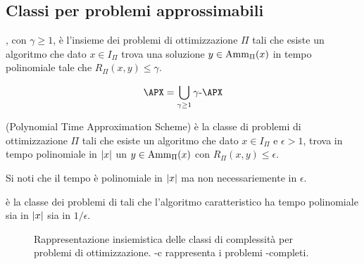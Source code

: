 \subsection{Classi per problemi approssimabili}

\begin{defin}[\gAPX{$\gamma$}]
	\gAPX{$\gamma$}, con $\gamma\geq1$, è l'insieme dei problemi di ottimizzazione $\Pi$ tali che esiste un algoritmo che dato $x\in I_\Pi$ trova una soluzione $y\in\mathrm{Amm}_\Pi(x)$ in tempo polinomiale tale che $R_\Pi(x,y)\leq \gamma$.
\end{defin}
\begin{defin}[\APX]
	\begin{equation*}
		\APX=\bigcup_{\gamma\geq1} \gAPX{\gamma}
	\end{equation*}
\end{defin}

\begin{defin}[\PTAS]
	\PTAS (Polynomial Time Approximation Scheme) è la classe di problemi di ottimizzazione $\Pi$ tali che esiste un algoritmo che dato $x\in I_\Pi$ e $\epsilon>1$, trova in tempo polinomiale in $|x|$ un $y\in\mathrm{Amm}_\Pi(x)$ con $R_\Pi(x,y)\leq\epsilon$.
\end{defin}
\noindent Si noti che il tempo è polinomiale in $|x|$ ma non necessariemente in $\epsilon$.
\begin{defin}[\FPTAS]
	\FPTAS è la classe dei problemi di \PTAS tali che l'algoritmo caratteristico ha tempo polinomiale sia in $|x|$ sia in $1/\epsilon$.
\end{defin}


\begin{figure}
	\centering
	
	\caption{Rappresentazione insiemistica delle classi di complessità per problemi di ottimizzazione. \NPO-c rappresenta i problemi \NPO-completi.}
	\label{fig:compsets}
\end{figure}
